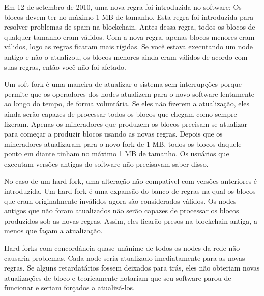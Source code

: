 Em 12 de setembro de 2010, uma nova regra foi introduzida no software: Os blocos devem ter no máximo 1 MB de tamanho. 
Esta regra foi introduzida para resolver problemas de spam na blockchain.
Antes dessa regra, todos os blocos de qualquer tamanho eram válidos.
Com a nova regra, apenas blocos menores eram válidos, logo as regras ficaram mais rígidas.
Se você estava executando um node antigo e não o atualizou, os blocos menores ainda eram válidos de acordo com suas regras, então você não foi afetado.

Um soft-fork é uma maneira de atualizar o sistema sem interrupções porque permite que os operadores dos nodes atualizem para o novo software lentamente ao longo do tempo, de forma voluntária.
Se eles não fizerem a atualização, eles ainda serão capazes de processar todos os blocos que chegam como sempre fizeram.
Apenas os  mineradores que produzem os blocos precisam se atualizar para começar a produzir blocos usando as novas regras.
Depois que os mineradores atualizaram para o novo fork de 1 MB, todos os blocos daquele ponto em diante tinham no máximo 1 MB de tamanho.
Os usuários que executam versões antigas do software não precisavam saber disso.



No caso de um hard fork, uma alteração não compatível com versões anteriores é introduzida.
Um hard fork é uma expansão do banco de regras na qual os blocos que eram originalmente inválidos agora são considerados válidos.
Os nodes antigos que não foram atualizados não serão capazes de processar os blocos produzidos sob as novas regras. 
Assim, eles ficarão presos na blockchain antiga, a menos que façam a atualização. 


Hard forks com concordância quase unânime de todos os nodes da rede não causaria problemas. 
Cada node seria atualizado imediatamente para as novas regras. 
Se alguns retardatários fossem deixados para trás, eles não obteriam novas atualizações de bloco e teoricamente notariam que seu software parou de funcionar e seriam forçados a atualizá-los.

